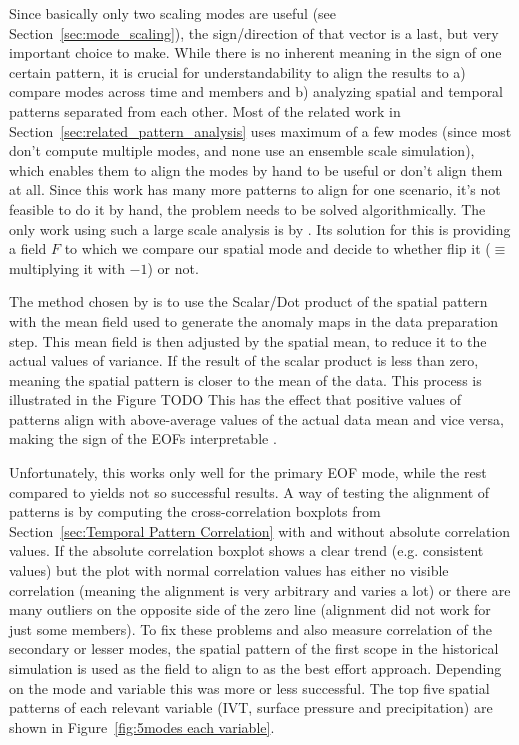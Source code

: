 Since basically only two scaling modes are useful (see Section~\ref{sec:mode_scaling}), the sign/direction of that vector is a last, but very important choice to make.
While there is no inherent meaning in the sign of one certain pattern, it is crucial for understandability to align the results to a) compare modes across time and members and b) analyzing spatial and temporal patterns separated from each other. 
Most of the related work in Section~\ref{sec:related_pattern_analysis} uses maximum of a few modes (since most don't compute multiple modes, and none use an ensemble scale simulation), which enables them to align the modes by hand to be useful or don't align them at all.
Since this work has many more patterns to align for one scenario, it's not feasible to do it by hand, the problem needs to be solved algorithmically. 
The only work using such a large scale analysis is by \citeauthor{vietinghoffdiss} \cite{vietinghoffdiss}.  
Its solution for this is providing a field $F$ to which we compare our spatial mode and decide to whether flip it ($\equiv$ multiplying it with $-1$) or not. 

The method chosen by \citeauthor{vietinghoffdiss} \cite{vietinghoffdiss} is to use the Scalar/Dot product of the spatial pattern with the mean field used to generate the anomaly maps in the data preparation step. 
This mean field is then adjusted by the spatial mean, to reduce it to the actual values of variance. 
If the result of the scalar product is less than zero, meaning the spatial pattern is closer to the mean of the data. 
This process is illustrated in the Figure TODO  
This has the effect that positive values of patterns align with above-average values of the actual data mean and vice versa, making the sign of the EOFs interpretable \cite{vietinghoffdiss}.  

Unfortunately, this works only well for the primary EOF mode, while the rest compared to yields not so successful results. 
A way of testing the alignment of patterns is by computing the cross-correlation boxplots from Section~\ref{sec:Temporal Pattern Correlation} with and without absolute correlation values. 
If the absolute correlation boxplot shows a clear trend (e.g. consistent values) but the plot with normal correlation values has either no visible correlation (meaning the alignment is very arbitrary and varies a lot) or there are many outliers on the opposite side of the zero line (alignment did not work for just some members). 
To fix these problems and also measure correlation of the secondary or lesser modes, the spatial pattern of the first scope in the historical simulation is used as the field to align to as the best effort approach. Depending on the mode and variable this was more or less successful. 
The top five spatial patterns of each relevant variable (IVT, surface pressure and precipitation) are shown in Figure~\ref{fig:5modes each variable}.



